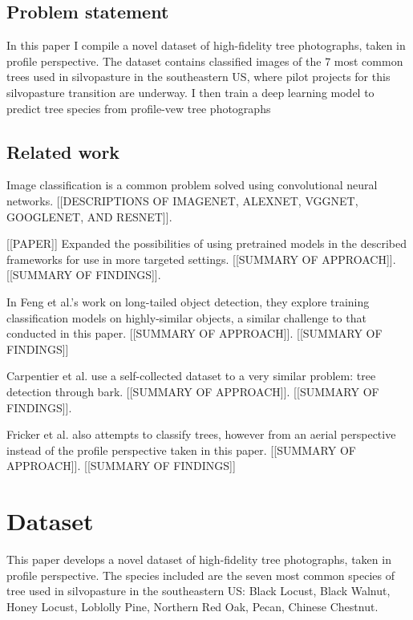\documentclass[10pt,twocolumn,letterpaper]{article}
\begin{document}
\subsection{Problem statement}

In this paper I compile a novel dataset of high-fidelity tree photographs, taken in profile perspective. The dataset contains classified images of the 7 most common trees used in silvopasture in the southeastern US, where pilot projects for this silvopasture transition are underway. I then train a deep learning model to predict tree species from profile-vew tree photographs

\subsection{Related work}

Image classification is a common problem solved using convolutional neural networks. [[DESCRIPTIONS OF IMAGENET, ALEXNET, VGGNET, GOOGLENET, AND RESNET]]. 

[[PAPER]] Expanded the possibilities of using pretrained models in the described frameworks for use in more targeted settings. [[SUMMARY OF APPROACH]]. [[SUMMARY OF FINDINGS]].

In Feng et al.'s work on long-tailed object detection, they explore training classification models on highly-similar objects, a similar challenge to that conducted in this paper.  [[SUMMARY OF APPROACH]]. [[SUMMARY OF FINDINGS]]

Carpentier et al. use a self-collected dataset to a very similar problem: tree detection through bark. [[SUMMARY OF APPROACH]]. [[SUMMARY OF FINDINGS]].

Fricker et al. also attempts to classify trees, however from an aerial perspective instead of the profile perspective taken in this paper. [[SUMMARY OF APPROACH]]. [[SUMMARY OF FINDINGS]]

\section{Dataset}

This paper develops a novel dataset of high-fidelity tree photographs, taken in profile perspective. The species included are the seven most common species of tree used in silvopasture in the southeastern US: Black Locust, Black Walnut, Honey Locust, Loblolly Pine, Northern Red Oak, Pecan, Chinese Chestnut. 
\end{document}
